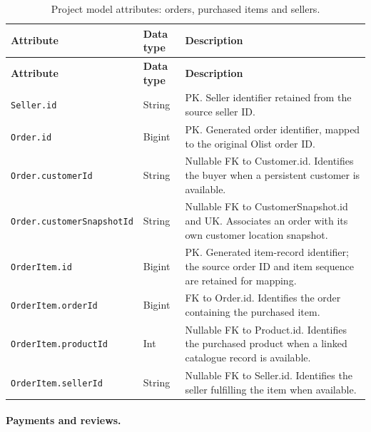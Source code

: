 \documentclass[a4paper,12pt]{article}
\newcommand{\tablestyle}{%
  \small\setstretch{1.05}%
  \renewcommand{\arraystretch}{1.25}%
  \setlength{\extrarowheight}{3pt}%
  \arrayrulecolor{tableborder}%
}
\begin{document}
{\tablestyle
\begin{longtable}{|L{5.7cm}|L{2.1cm}|L{\dimexpr\textwidth-7.8cm-6\arrayrulewidth\relax}|}
  \caption{Project model attributes: orders, purchased items and sellers.}
  \label{tab:project-model-3}\\
  \hline
  \textbf{Attribute} & \textbf{Data type} & \textbf{Description} \\[3pt]\hline
  \endfirsthead
  \hline
  \textbf{Attribute} & \textbf{Data type} & \textbf{Description} \\[3pt]\hline
  \endhead
  \endfoot
  \endlastfoot
  \nolinkurl{Seller.id} & String & PK. Seller identifier retained from the source seller ID. \\[3pt]\hline
  \nolinkurl{Order.id} & Bigint & PK. Generated order identifier, mapped to the original Olist order ID. \\[3pt]\hline
  \nolinkurl{Order.customerId} & String & Nullable FK to Customer.id. Identifies the buyer when a persistent customer is available. \\[3pt]\hline
  \nolinkurl{Order.customerSnapshotId} & String & Nullable FK to CustomerSnapshot.id and UK. Associates an order with its own customer location snapshot. \\[3pt]\hline
  \nolinkurl{OrderItem.id} & Bigint & PK. Generated item-record identifier; the source order ID and item sequence are retained for mapping. \\[3pt]\hline
  \nolinkurl{OrderItem.orderId} & Bigint & FK to Order.id. Identifies the order containing the purchased item. \\[3pt]\hline
  \nolinkurl{OrderItem.productId} & Int & Nullable FK to Product.id. Identifies the purchased product when a linked catalogue record is available. \\[3pt]\hline
  \nolinkurl{OrderItem.sellerId} & String & Nullable FK to Seller.id. Identifies the seller fulfilling the item when available. \\[3pt]\hline
\end{longtable}
}

\paragraph{Payments and reviews.}
\end{document}
